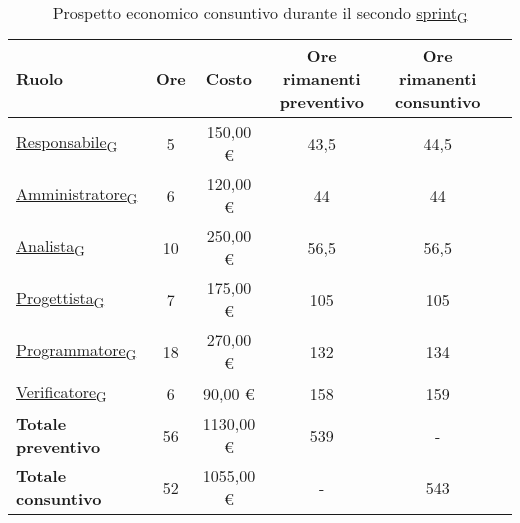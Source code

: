 \begin{table}[!h]
	\centering
	\begin{tabular}{ | l | c | c | c | c | c | }
		\hline
		\textbf{Ruolo}             & \textbf{Ore} & \textbf{Costo} & \textbf{Ore rimanenti preventivo} & \textbf{Ore rimanenti consuntivo} \\
		\hline
		\href{https://7last.github.io/docs/pb/documentazione-interna/glossario\#responsabile}{Responsabile\textsubscript{G}}               & 5            & 150,00 €       & 43,5                              & 44,5                              \\
		\href{https://7last.github.io/docs/pb/documentazione-interna/glossario\#amministratore}{Amministratore\textsubscript{G}}             & 6            & 120,00 €       & 44                                & 44                                \\
		\href{https://7last.github.io/docs/pb/documentazione-interna/glossario\#analista}{Analista\textsubscript{G}}                   & 10           & 250,00 €       & 56,5                              & 56,5                              \\
		\href{https://7last.github.io/docs/pb/documentazione-interna/glossario\#progettista}{Progettista\textsubscript{G}}                & 7            & 175,00 €       & 105                               & 105                               \\
		\href{https://7last.github.io/docs/pb/documentazione-interna/glossario\#programmatore}{Programmatore\textsubscript{G}}              & 18           & 270,00 €       & 132                               & 134                               \\
		\href{https://7last.github.io/docs/pb/documentazione-interna/glossario\#verificatore}{Verificatore\textsubscript{G}}               & 6            & 90,00 €        & 158                               & 159                               \\
		\hline
		\textbf{Totale preventivo} & 56           & 1130,00 €      & 539                               & -                                 \\
		\hline
		\textbf{Totale consuntivo} & 52           & 1055,00 €      & -                                 & 543                               \\
		\hline
	\end{tabular}
	\caption{Prospetto economico consuntivo durante il secondo \href{https://7last.github.io/docs/pb/documentazione-interna/glossario\#sprint}{sprint\textsubscript{G}}}
	
\end{table}

